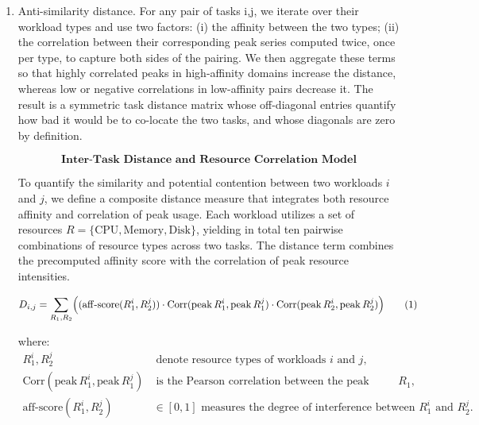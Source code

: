 \begin{enumerate}
    \item Anti-similarity distance. For any pair of tasks i,j, we iterate over their workload types and use two factors: (i) the affinity between the two types; (ii) the correlation between their corresponding peak series computed twice, once per type, to capture both sides of the pairing. We then aggregate these terms so that highly correlated peaks in high-affinity domains increase the distance, whereas low or negative correlations in low-affinity pairs decrease it. The result is a symmetric task distance matrix whose off-diagonal entries quantify how bad it would be to co-locate the two tasks, and whose diagonals are zero by definition.

          \[
              \textbf{Inter-Task Distance and Resource Correlation Model}
          \]

          To quantify the similarity and potential contention between two workloads
          \( i \) and \( j \), we define a composite distance measure
          that integrates both resource affinity and correlation of peak usage.
          Each workload utilizes a set of resources
          \( R = \{ \text{CPU}, \text{Memory}, \text{Disk}\} \),
          yielding in total ten pairwise combinations of resource types across two tasks.
          The distance term combines the precomputed affinity score with the
          correlation of peak resource intensities.

          \[
              D_{i,j}
              = \sum_{R_1, R_2}
              \Bigl(
              (\mathrm{aff\text{-}score}(R_1^i, R_2^j))
              \cdot
              \mathrm{Corr}(\mathrm{peak}\,R_1^i, \mathrm{peak}\,R_1^j)
              \cdot
              \mathrm{Corr}(\mathrm{peak}\,R_2^i, \mathrm{peak}\,R_2^j)
              \Bigr)
              \tag{1}
          \]

          where:
          \begin{align}
              R_1^i, R_2^j & \; \text{denote resource types of workloads } i \text{ and } j,                           \\[4pt]
              \mathrm{Corr}(\mathrm{peak}\,R_1^i, \mathrm{peak}\,R_1^j)
                           & \; \text{is the Pearson correlation between the peak usages of resource } R_1,            \\[4pt]
              \mathrm{aff\text{-}score}(R_1^i, R_2^j)
                           & \in [0, 1] \text{ measures the degree of interference between } R_1^i \text{ and } R_2^j.
          \end{align}


\end{enumerate}
